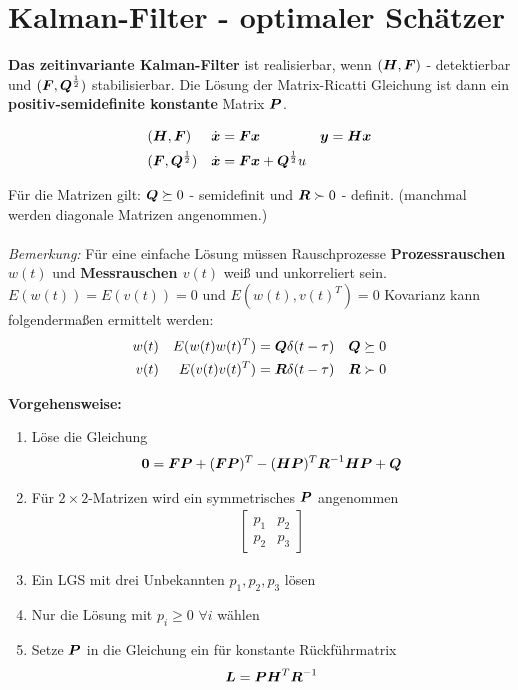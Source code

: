 \columnbreak

\section{Kalman-Filter - optimaler Schätzer}
\begin{tcolorbox}[colback=white!10!white,colframe=green!30!black] 
	\textbf{Das zeitinvariante Kalman-Filter} ist realisierbar, wenn
	$(\boldsymbol{H},\boldsymbol{F})$ - detektierbar und $(\boldsymbol{F},\boldsymbol{Q}^{\frac{1}{2}})$ stabilisierbar. Die Lösung der Matrix-Ricatti Gleichung ist dann ein \textbf{positiv-semidefinite konstante} Matrix $\boldsymbol{P}$. 
	\begin{tcolorbox}[colback=white!10!white,colframe=green!30!black]
		\begin{align*}
		&	(\boldsymbol{H},\boldsymbol{F})& &\dot{\boldsymbol{x}} = \boldsymbol{Fx} & &\boldsymbol{y} = \boldsymbol{Hx}\\
		&	(\boldsymbol{F},\boldsymbol{Q}^{\frac{1}{2}})&& \dot{\boldsymbol{x}} = \boldsymbol{Fx}+\boldsymbol{Q}^{\frac{1}{2}}u & &
		\end{align*}
	\end{tcolorbox}
	
	Für die Matrizen gilt: $\boldsymbol{Q}\succeq0$ - semidefinit und $\boldsymbol{R}\succ0$ - definit. (manchmal werden diagonale Matrizen angenommen.)
	\\\\
	\textit{Bemerkung:} Für eine einfache Lösung müssen Rauschprozesse \textbf{Prozessrauschen $w(t)$} und \textbf{Messrauschen $v(t)$} weiß und unkorreliert sein. $E(w(t))= E(v(t)) =0$ und $E(w(t),v(t)^T)=0$
	Kovarianz kann folgendermaßen ermittelt werden:
		\begin{align*}
			w(t) & & E(w(t)w(t)^T) =\boldsymbol{Q}\delta(t-\tau) && \boldsymbol{Q} \succeq 0 \\ v(t) & & E(v(t)v(t)^T) = \boldsymbol{R}\delta(t-\tau) && \boldsymbol{R} \succ 0
 		\end{align*}
	
	\tcblower
	\textbf{Vorgehensweise:}
	\begin{enumerate}
		\item Löse die Gleichung\begin{align*}
			\boldsymbol{0} = \boldsymbol{FP} + (\boldsymbol{FP})^T -(\boldsymbol{HP})^T\boldsymbol{R}^{-1}\boldsymbol{HP} +\boldsymbol{Q}
		\end{align*}
		\item Für $2\times2$-Matrizen wird ein symmetrisches $\boldsymbol{P}$ angenommen\begin{align*}
			\begin{bmatrix}
			p_1 & p_2 \\ p_2 & p_3
			\end{bmatrix}
		\end{align*}
			\item Ein LGS mit drei Unbekannten $p_1,p_2,p_3$ lösen 
			\item Nur die Lösung mit $p_i\geq 0$   $\forall i$ wählen
			\item Setze $\boldsymbol{P}$ in die Gleichung ein für konstante Rückführmatrix
			 \begin{align*}
				\boldsymbol{L} = \boldsymbol{PH}^T\boldsymbol{R}^{-1}
			\end{align*} 
	\end{enumerate}
	
	
\end{tcolorbox}